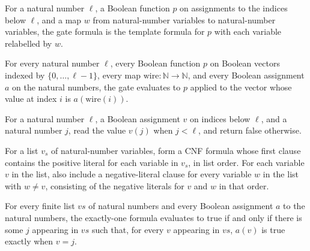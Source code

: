 \begin{definition}
\label{Complexity.FormulaKit.gate}
\leanok
{}
For a natural number $\ell$, a Boolean function $p$ on assignments to the indices below
$\ell$, and a map $w$ from natural-number variables to natural-number variables, the
gate formula is the template formula for $p$ with each variable relabelled by $w$.
\end{definition}

\begin{theorem}
\label{Complexity.FormulaKit.gate_eval}
\leanok
{}
For every natural number $\ell$, every Boolean function $p$ on Boolean vectors indexed
by $\{0,\ldots,\ell-1\}$, every map $\mathrm{wire}:\mathbb{N}\to\mathbb{N}$, and every
Boolean assignment $a$ on the natural numbers, the gate evaluates to $p$ applied to the
vector whose value at index $i$ is $a(\mathrm{wire}(i))$.
\end{theorem}

\begin{definition}
\label{Complexity.FormulaKit.readBit}
\leanok
For a natural number $\ell$, a Boolean assignment $v$ on indices below $\ell$, and a
natural number $j$, read the value $v(j)$ when $j<\ell$, and return false otherwise.
\end{definition}

\begin{definition}
\label{Complexity.FormulaKit.exactlyOne}
\leanok
For a list $v_s$ of natural-number variables, form a CNF formula whose first clause
contains the positive literal for each variable in $v_s$, in list order. For each
variable $v$ in the list, also include a negative-literal clause for every variable $w$
in the list with $w\ne v$, consisting of the negative literals for $v$ and $w$ in that
order.
\end{definition}

\begin{theorem}
\label{Complexity.FormulaKit.exactlyOne_eval}
\leanok
{}
For every finite list $vs$ of natural numbers and every Boolean assignment $a$ to the
natural numbers, the exactly-one formula evaluates to true if and only if there is some
$j$ appearing in $vs$ such that, for every $v$ appearing in $vs$, $a(v)$ is true exactly
when $v=j$.
\end{theorem}

